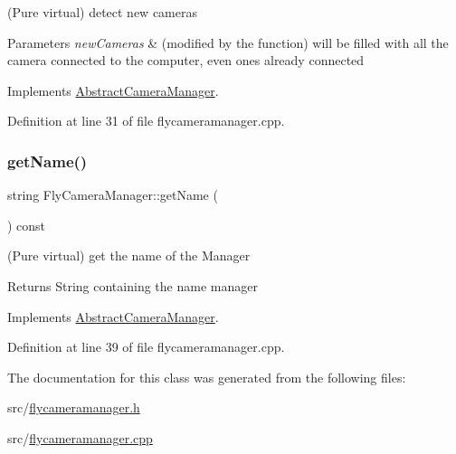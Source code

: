 (Pure virtual) detect new cameras 


\begin{DoxyParams}{Parameters}
{\em new\+Cameras} & (modified by the function) will be filled with all the camera connected to the computer, even ones already connected \\
\hline
\end{DoxyParams}


Implements \mbox{\hyperlink{class_abstract_camera_manager_a5285c2cf6e1976d0c22e46f01efdef51}{Abstract\+Camera\+Manager}}.



Definition at line 31 of file flycameramanager.\+cpp.

\mbox{\label{class_fly_camera_manager_a4e368cea1f4cedf26b653518c75c1433}} 
\subsubsection{\texorpdfstring{getName()}{getName()}}
{\footnotesize\ttfamily string Fly\+Camera\+Manager\+::get\+Name (\begin{DoxyParamCaption}{ }\end{DoxyParamCaption}) const\hspace{0.3cm}{\ttfamily [virtual]}}



(Pure virtual) get the name of the Manager 

\begin{DoxyReturn}{Returns}
String containing the name manager 
\end{DoxyReturn}


Implements \mbox{\hyperlink{class_abstract_camera_manager_a6e4b041842471b9ed42ddd5c9ab260d1}{Abstract\+Camera\+Manager}}.



Definition at line 39 of file flycameramanager.\+cpp.



The documentation for this class was generated from the following files\+:\begin{DoxyCompactItemize}
\item 
src/\mbox{\hyperlink{flycameramanager_8h}{flycameramanager.\+h}}\item 
src/\mbox{\hyperlink{flycameramanager_8cpp}{flycameramanager.\+cpp}}\end{DoxyCompactItemize}
